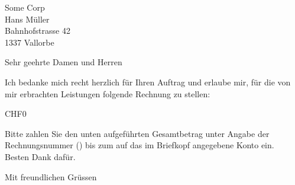 \documentclass[DIN,SN,10pt,DIV=18,_rechnung]{scrlttr2}
\begin{document}
  \begin{letter}{
      Some Corp \\
      Hans Müller \\
      Bahnhofstrasse 42 \\
      1337 Vallorbe
    }

    \opening{Sehr geehrte Damen und Herren}

    Ich bedanke mich recht herzlich für Ihren Auftrag und erlaube mir, für die
    von mir erbrachten Leistungen folgende Rechnung zu stellen:

    \begin{invoice}{CHF}{0}
      
    \end{invoice}

    \begin{samepage}
      Bitte zahlen Sie den unten aufgeführten Gesamtbetrag unter Angabe der
      Rechnungsnummer () bis zum  auf
      das im Briefkopf angegebene Konto ein.\\
      Besten Dank dafür.

      \closing{Mit freundlichen Grüssen}

    \end{samepage}
 \end{letter}
\end{document}

